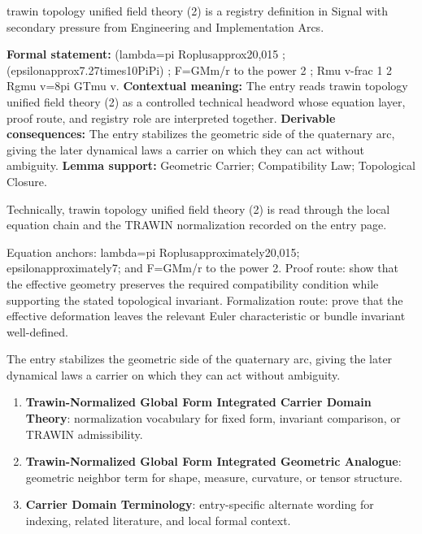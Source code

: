
\begingroup\small
{}
trawin topology unified field theory (2) is a registry definition in Signal with secondary pressure from Engineering and Implementation Arcs.

\begingroup\footnotesize\setlength{\emergencystretch}{3em}\sloppy
\textbf{Formal statement:} (lambda=pi Roplusapprox20,015 ; (epsilonapprox7.27times10PiPi) ; F=GMm/r to the power 2 ; Rmu v-frac 1 2 Rgmu v=8pi GTmu v. \textbf{Contextual meaning:} The entry reads trawin topology unified field theory (2) as a controlled technical headword whose equation layer, proof route, and registry role are interpreted together. \textbf{Derivable consequences:} The entry stabilizes the geometric side of the quaternary arc, giving the later dynamical laws a carrier on which they can act without ambiguity. \textbf{Lemma support:} Geometric Carrier; Compatibility Law; Topological Closure.\par
\endgroup

Technically, trawin topology unified field theory (2) is read through the local equation chain and the TRAWIN normalization recorded on the entry page.

Equation anchors: lambda=pi Roplusapproximately20,015; epsilonapproximately7; and F=GMm/r to the power 2. Proof route: show that the effective geometry preserves the required compatibility condition while supporting the stated topological invariant. Formalization route: prove that the effective deformation leaves the relevant Euler characteristic or bundle invariant well-defined.

The entry stabilizes the geometric side of the quaternary arc, giving the later dynamical laws a carrier on which they can act without ambiguity.
\endgroup

\begin{enumerate}[leftmargin=1.6em,itemsep=6pt,topsep=4pt]
\item \textbf{Trawin-Normalized Global Form Integrated Carrier Domain Theory}: normalization vocabulary for fixed form, invariant comparison, or TRAWIN admissibility.
\item \textbf{Trawin-Normalized Global Form Integrated Geometric Analogue}: geometric neighbor term for shape, measure, curvature, or tensor structure.
\item \textbf{Carrier Domain Terminology}: entry-specific alternate wording for indexing, related literature, and local formal context.
\end{enumerate}

